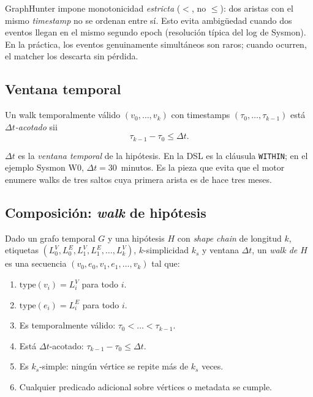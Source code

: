 \begin{nota}
GraphHunter impone monotonicidad \emph{estricta} (\(<\), no \(\leq\)):
dos aristas con el mismo \emph{timestamp} no se ordenan entre sí.
Esto evita ambigüedad cuando dos eventos llegan en el mismo segundo
epoch (resolución típica del log de Sysmon). En la práctica, los
eventos genuinamente simultáneos son raros; cuando ocurren, el
matcher los descarta sin pérdida.
\end{nota}

\subsection{Ventana temporal}

\begin{definition}
Un walk temporalmente válido \((v_0, \dots, v_k)\) con timestamps
\((\tau_0, \dots, \tau_{k-1})\) está \emph{\(\Delta t\)-acotado} sii
\[
\tau_{k-1} - \tau_0 \leq \Delta t.
\]
\end{definition}

\(\Delta t\) es la \emph{ventana temporal} de la hipótesis. En la DSL
es la cláusula \texttt{WITHIN}; en el ejemplo Sysmon W0,
\(\Delta t = 30\)~minutos. Es la pieza que evita que el motor enumere
walks de tres saltos cuya primera arista es de hace tres meses.

\subsection{Composición: \emph{walk} de hipótesis}

\begin{definition}
Dado un grafo temporal \(G\) y una hipótesis \(H\) con \emph{shape}
\emph{chain} de longitud \(k\), etiquetas
\((L_0^V, L_0^E, L_1^V, L_1^E, \dots, L_k^V)\), \(k\)-simplicidad
\(k_s\) y ventana \(\Delta t\), un \emph{walk de \(H\)} es una
secuencia
\((v_0, e_0, v_1, e_1, \dots, v_k)\) tal que:
\begin{enumerate}
    \item \(\mathrm{type}(v_i) = L_i^V\) para todo \(i\).
    \item \(\mathrm{type}(e_i) = L_i^E\) para todo \(i\).
    \item Es temporalmente válido: \(\tau_0 < \dots < \tau_{k-1}\).
    \item Está \(\Delta t\)-acotado: \(\tau_{k-1} - \tau_0 \leq
    \Delta t\).
    \item Es \(k_s\)-simple: ningún vértice se repite más de \(k_s\)
    veces.
    \item Cualquier predicado adicional sobre vértices o metadata se
    cumple.
\end{enumerate}
\end{definition}

